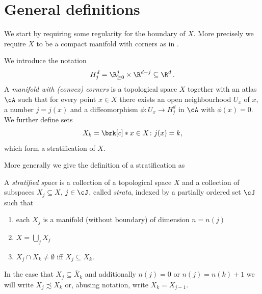\section{General definitions}

We start by requiring some regularity for the boundary of $X$.
More precisely we require $X$ to be a compact manifold with corners as in \cite{Handron2002}.
\begin{definition}
  We introduce the notation
  \begin{align*}
    H_j^d=\R_{\geq0}^j\times\R^{d-j}\subseteq\R^d\,.
  \end{align*}
  A \emph{manifold with (convex) corners} is a topological space $X$ together with an atlas $\cA$ such that for every point
  $x\in X$ there exists an open neighbourhood $U_x$ of $x$, a number $j=j(x)$ and a
  diffeomorphism $\phi\colon U_x\to H_j^d$ in $\cA$ with $\phi(x)=0$.
  We further define sets 
  \begin{align}
    X_k=\brk[c]*{x\in X\colon j(x)=k}\label{eq:def_mfCorners_stratification},
  \end{align}
  which form a stratification of $X$.
\end{definition}

More generally we give the definition of a stratification as 
\begin{definition}\label{df:stratified_space}
  A \emph{stratified space} is a collection of a topological space $X$ and a collection of subspaces
  $X_j\subseteq X$, $j\in\cJ$, called \emph{strata},  indexed by a partially ordered set $\cJ$ such that
  \begin{enumerate}
    \item each $X_j$ is a manifold (without boundary) of dimension $n=n(j)$
    \item $X=\bigcup_jX_j$
    \item $X_j\cap \overline{X}_k\neq\emptyset$ iff $X_j\subseteq\overline{X}_k$.
  \end{enumerate}
  In the case that $X_j\subseteq\overline{X}_k$ and additionally $n(j)=0$ or $n(j)=n(k)+1$ we will
  write $X_j\precsim X_k$ or, abusing notation, write $X_k=X_{j-1}$.
\end{definition}

